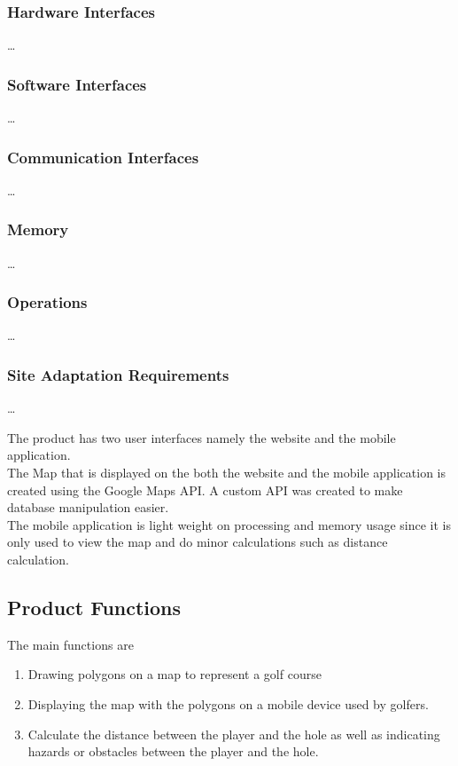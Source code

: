 \documentclass{article}
\begin{document}
    \subsubsection{Hardware Interfaces}
    \ldots

    \subsubsection{Software Interfaces}
    \ldots

    \subsubsection{Communication Interfaces}
    \ldots

    \subsubsection{Memory}
    \ldots

    \subsubsection{Operations}
    \ldots

    \subsubsection{Site Adaptation Requirements}
    \ldots

    The product has two user interfaces namely the website and the mobile
    application.\\ The Map that is displayed on the both the website and the
    mobile application is created using the Google Maps API. A custom API was
    created to make database manipulation easier.\\ The mobile application is
    light weight on processing and memory usage since it is only used to view
    the map and do minor calculations such as distance calculation.

    \subsection{Product Functions}
    The main functions are
    \begin{enumerate}
        \item
            Drawing polygons on a map to represent a golf course
        \item
            Displaying the map with the polygons on a mobile device used by
            golfers.
        \item
            Calculate the distance between the player and the hole as well as
            indicating hazards or  obstacles between the player and the hole.
    \end{enumerate}
\end{document}
